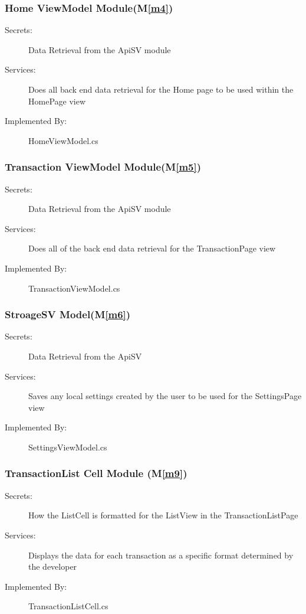 \documentclass[12pt, titlepage]{article}
\newcommand{\mref}[1]{M\ref{#1}}
\begin{document}
\subsubsection{Home ViewModel Module(\mref{m4})}
\begin{description}
\item[Secrets:] Data Retrieval from the ApiSV module
\item[Services:] Does all back end data retrieval for the Home page to be used within the HomePage view
\item[Implemented By:] HomeViewModel.cs
\end{description}

\subsubsection{Transaction ViewModel Module(\mref{m5})}
\begin{description}
\item[Secrets:] Data Retrieval from the ApiSV module
\item[Services:] Does all of the back end data retrieval for the TransactionPage view
\item[Implemented By:] TransactionViewModel.cs
\end{description}

\subsubsection{StroageSV Model(\mref{m6})}
\begin{description}
\item[Secrets:] Data Retrieval from the ApiSV
\item[Services:] Saves any local settings created by the user to be used for the SettingsPage view
\item[Implemented By:] SettingsViewModel.cs
\end{description}

\subsubsection{TransactionList Cell Module (\mref{m9})}
\begin{description}
\item[Secrets:] How the ListCell is formatted for the ListView in the TransactionListPage
\item[Services:] Displays the data for each transaction as a specific format determined by the developer
\item[Implemented By:] TransactionListCell.cs
\end{description}
\end{document}
